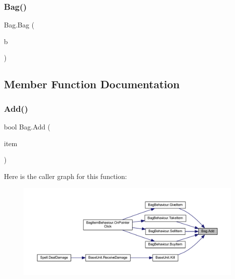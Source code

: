 \subsubsection{\texorpdfstring{Bag()}{Bag()}\hspace{0.1cm}{\footnotesize\ttfamily [2/2]}}
{\footnotesize\ttfamily Bag.\+Bag (\begin{DoxyParamCaption}\item[{\mbox{\hyperlink{class_bag_a5a827c44705d57202edc93b9a39316c7}{Bag\+Type}}}]{b }\end{DoxyParamCaption})}



\subsection{Member Function Documentation}
\mbox{\label{class_bag_a4efd17483fce361ea8a01dcda349b3b4}} 
\subsubsection{\texorpdfstring{Add()}{Add()}}
{\footnotesize\ttfamily bool Bag.\+Add (\begin{DoxyParamCaption}\item[{\mbox{\hyperlink{class_base_item}{Base\+Item}}}]{item }\end{DoxyParamCaption})}

Here is the caller graph for this function\+:
\nopagebreak
\begin{figure}[H]
\begin{center}
\leavevmode
\includegraphics[width=350pt]{class_bag_a4efd17483fce361ea8a01dcda349b3b4_icgraph}
\end{center}
\end{figure}
\mbox{\label{class_bag_a85aa679243be4a24a6278d5f68c2ed5e}} 
